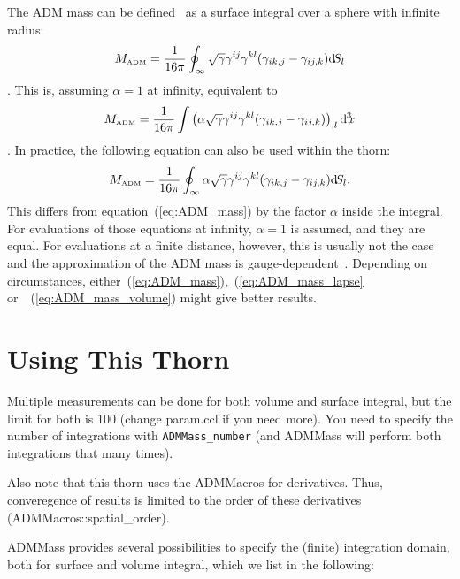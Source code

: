  The ADM mass can be defined~\cite{ADM_mass_Omurchadha74} as a surface integral over a
 sphere with infinite radius:
 \begin{equation}
 \label{eq:ADM_mass}
  M_{\mbox{\tiny ADM}}=\frac{1}{16\pi}\oint_\infty
  \sqrt{\gamma}\gamma^{ij}\gamma^{kl}
  (\gamma_{ik,j}-\gamma_{ij,k})\textrm{d}\! S_l
 \end{equation}.
 This is, assuming $\alpha=1$ at infinity, equivalent to
 \begin{equation}
 \label{eq:ADM_mass_volume}
  M_{\mbox{\tiny ADM}}=\frac{1}{16\pi}\int
  \left(\alpha\sqrt{\gamma}\gamma^{ij}\gamma^{kl}
  (\gamma_{ik,j}-\gamma_{ij,k})\right)_{,l}\textrm{d}\!^{\,3}\!\!x
 \end{equation}.
In practice, the following equation can also be used within the thorn:
  \begin{equation}
   \label{eq:ADM_mass_lapse}
   M_{\mbox{\tiny ADM}}=\frac{1}{16\pi}\oint_\infty
   \alpha\sqrt{\gamma}\gamma^{ij}\gamma^{kl}
   (\gamma_{ik,j}-\gamma_{ij,k})\textrm{d}\! S_l.
  \end{equation}
  This differs from equation~(\ref{eq:ADM_mass}) by the factor $\alpha$ inside
  the integral. For evaluations of those equations at infinity, $\alpha=1$ is
  assumed, and they are equal. For evaluations at a finite distance, however,
  this is usually not the case and the approximation of the ADM mass is
  gauge-dependent~\cite{ADM_mass_Omurchadha74}. Depending on circumstances,
  either~(\ref{eq:ADM_mass}),~(\ref{eq:ADM_mass_lapse} or~~(\ref{eq:ADM_mass_volume})
  might give better results.

\section{Using This Thorn}

Multiple measurements can be done for both volume and surface integral, but the
limit for both is 100 (change param.ccl if you need more). You need to
specify the number of integrations with \texttt{ADMMass\_number} (and ADMMass
will perform both integrations that many times).

Also note that this thorn uses the ADMMacros for derivatives. Thus, converegence
of results is limited to the order of these derivatives (ADMMacros::spatial\_order).

ADMMass provides several possibilities to specify the (finite) integration domain,
both for surface and volume integral, which we list in the following:

